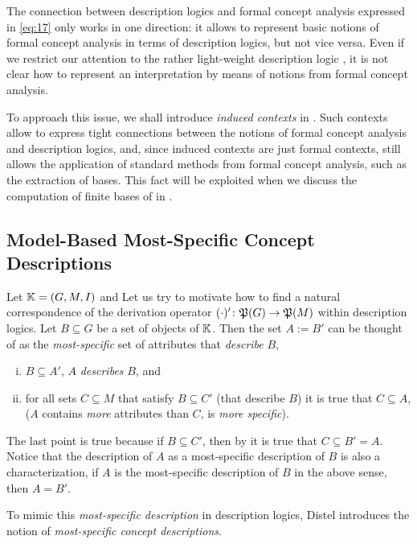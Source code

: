 The connection between description logics and formal concept analysis expressed in
\eqref{eq:17} only works in one direction: it allows to represent basic notions of formal
concept analysis in terms of description logics, but not vice versa.  Even if we restrict
our attention to the rather light-weight description logic \ELbot, it is not clear how to
represent an interpretation by means of notions from formal concept analysis.

To approach this issue, we shall introduce \emph{induced contexts} in
.  Such contexts allow to express tight connections between the
notions of formal concept analysis and description logics, and, since induced contexts are
just formal contexts, still allows the application of standard methods from formal concept
analysis, such as the extraction of bases.  This fact will be exploited when we discuss
the computation of finite bases of in .

\subsection{Model-Based Most-Specific Concept Descriptions}
\label{sec:defin-and-basic}

Let ${\mathbb{K}} = (G, M, I)$ and Let us try to motivate how to find a natural correspondence
of the derivation operator $(\cdot)' \colon {\ensuremath{\mathfrak{P}(G)}} \to {\ensuremath{\mathfrak{P}(M)}}$ within
description logics.  Let $B \subseteq G$ be a set of objects of ${\mathbb{K}}$.  Then the set $A
:= B'$ can be thought of as the \emph{most-specific} set of attributes that
\emph{describe} $B$, \ie
\begin{enumerate}[i. ]
\item $B \subseteq A'$, \ie $A$ \emph{describes} $B$, and
\item for all sets $C \subseteq M$ that satisfy $B \subseteq C'$ (that describe $B$) it is
  true that $C \subseteq A$, ($A$ contains \emph{more} attributes than $C$, \ie is
  \emph{more specific}).
\end{enumerate}
The last point is true because if $B \subseteq C'$, then by
 it is true that $C \subseteq B' = A$.  Notice
that the description of $A$ as a most-specific description of $B$ is also a
characterization, \ie if $A$ is the most-specific description of $B$ in the above sense,
then $A = B'$.

To mimic this \emph{most-specific description} in description logics, Distel introduces
the notion of \emph{most-specific concept descriptions}.

